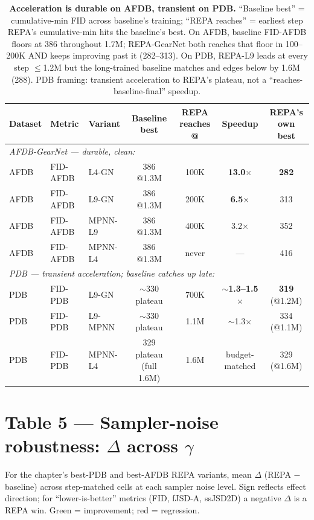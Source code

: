 \documentclass[11pt,a4paper]{article}
\begin{document}
\begin{table}[H]
\centering
\small
\begin{tabular}{lll|cccc}
\toprule
Dataset & Metric & Variant & Baseline best & REPA reaches @ & \textbf{Speedup} & REPA's own best \\
\midrule
\multicolumn{7}{l}{\textit{AFDB-GearNet --- durable, clean:}}\\
AFDB & FID-AFDB & L4-GN     & 386 @1.3M & 100K & \textbf{13.0$\times$} & \textbf{282} \\
AFDB & FID-AFDB & L9-GN     & 386 @1.3M & 200K & \textbf{6.5$\times$}  & 313 \\
AFDB & FID-AFDB & MPNN-L9   & 386 @1.3M & 400K & 3.2$\times$            & 352 \\
AFDB & FID-AFDB & MPNN-L4   & 386 @1.3M & never & ---                    & 416 \\
\midrule
\multicolumn{7}{l}{\textit{PDB --- transient acceleration; baseline catches up late:}}\\
PDB & FID-PDB & L9-GN    & $\sim$330 plateau & 700K & \textbf{$\sim$1.3--1.5$\times$} & \textbf{319} (@1.2M) \\
PDB & FID-PDB & L9-MPNN  & $\sim$330 plateau & 1.1M & $\sim$1.3$\times$       & 334 (@1.1M) \\
PDB & FID-PDB & MPNN-L4  & 329 plateau (full 1.6M) & 1.6M & budget-matched & 329 (@1.6M) \\
\bottomrule
\end{tabular}
\caption{\textbf{Acceleration is durable on AFDB, transient on PDB.}
``Baseline best'' = cumulative-min FID across baseline's training; ``REPA
reaches'' = earliest step REPA's cumulative-min hits the baseline's best.
On AFDB, baseline FID-AFDB floors at 386 throughout 1.7M; REPA-GearNet
both reaches that floor in 100--200K AND keeps improving past it
(282--313). On PDB, REPA-L9 leads at every step $\le$1.2M but the
long-trained baseline matches and edges below by 1.6M (288). PDB
framing: transient acceleration to REPA's plateau, not a
``reaches-baseline-final'' speedup.}
\end{table}

\section{Table 5 --- Sampler-noise robustness: $\Delta$ across $\gamma$}

For the chapter's best-PDB and best-AFDB REPA variants, mean $\Delta$
(REPA $-$ baseline) across step-matched cells at each sampler noise
level. Sign reflects effect direction; for ``lower-is-better'' metrics
(FID, fJSD-A, ssJSD2D) a negative $\Delta$ is a REPA win.
\colorbox{green!20}{Green} = improvement; \colorbox{red!15}{red} = regression.
\end{document}

